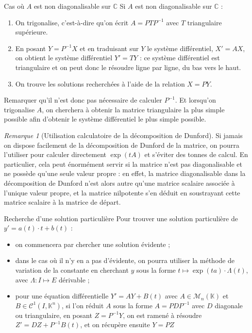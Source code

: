 \documentclass[french]{book}
\newcommand{\C}{\mathbb{C}}
\newcommand{\K}{\mathbb{K}}
\newcommand{\inv}{^{-1}}
\theoremstyle{plain}
\theoremstyle{definition}
\theoremstyle{remark}
\newtheorem*{rmq}{Remarque}
\begin{document}
\begin{PM}{Cas où $A$ est non diagonalisable sur $\C$} Si $A$ est non diagonalisable sur $\C$ :
\begin{enumerate}
	\item On trigonalise, c'est-à-dire qu'on écrit $A=PTP\inv$ avec $T$ triangulaire supérieure.
	\item En posant $Y=P\inv X$ et en traduisant sur $Y$ le système différentiel, $X'=AX$, on obtient le système différentiel $Y'=TY$ : ce système différentiel est triangulaire et on peut donc le résoudre ligne par ligne, du bas vers le haut.
	\item On trouve les solutions recherchées à l'aide de la relation $X=PY$.
\end{enumerate}
Remarquer qu'il n'est donc pas nécessaire de calculer $P\inv$. Et lorsqu'on trigonalise $A$, on cherchera à obtenir la matrice triangulaire la plus simple possible afin d'obtenir le système différentiel le plus simple possible.
\end{PM}
\begin{rmq}[Utilisation calculatoire de la décomposition de Dunford]
	Si jamais on dispose facilement de la décomposition de Dunford de la matrice, on pourra l'utiliser pour calculer directement $\exp(tA)$ et s'éviter des tonnes de calcul. En particulier, cela peut énormément servir si la matrice n'est pas diagonalisable et ne possède qu'une seule valeur propre : en effet, la matrice diagonalisable dans la décomposition de Dunford n'est alors autre qu'une matrice scalaire associée à l'unique valeur propre, et la matrice nilpotente s'en déduit en soustrayant cette matrice scalaire à la matrice de départ.
\end{rmq}
\begin{PM}{Recherche d'une solution particulière} Pour trouver une solution particulière de $y'=a(t)\cdot t+b(t)$ :
\begin{itemize}
	\item on commencera par chercher une solution évidente ;
	\item dans le cas où il n'y en a pas d'évidente, on pourra utiliser la méthode de variation de la constante en cherchant $y$ sous la forme $t\mapsto\exp(ta)\cdot\Lambda(t)$, avec $\Lambda:I\mapsto E$ dérivable ;
	\item pour une équation différentielle $Y'=AY+B(t)$ avec $A\in\mathcal{M}_n(\K)$ et $B\in\mathcal{C}^1(I,\K^n)$, si l'on réduit $A$ sous la forme $A=PDP\inv$ avec $D$ diagonale ou triangulaire, en posant $Z=P\inv Y$, on est ramené à résoudre $Z'=DZ+P\inv B(t)$, et on récupère ensuite $Y=PZ$
\end{itemize}
\end{PM}
\end{document}
